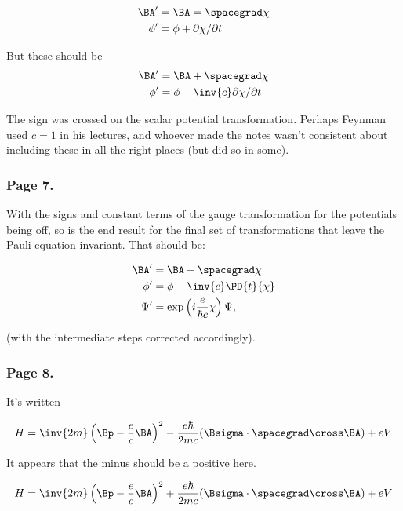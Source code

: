 \begin{align*}
\BA' &= \BA = \spacegrad \chi \\
\phi' &= \phi + \partial \chi / \partial t
\end{align*}

But these should be
\begin{align*}
\BA' &= \BA + \spacegrad \chi \\
\phi' &= \phi - \inv{c} \partial \chi / \partial t
\end{align*}

The sign was crossed on the scalar potential transformation.  Perhaps Feynman used $c=1$ in his lectures, and whoever made the notes wasn't consistent about including these in all the right places (but did so in some).

\subsubsection{Page 7.}

With the signs and constant terms of the gauge transformation for the potentials being off, so is the end result for the final set of transformations that leave the Pauli equation invariant.  That should be:

\begin{align*}
\BA' &= \BA + \spacegrad \chi \\
\phi' &= \phi - \inv{c} \PD{t}{ \chi } \\
\Psi' &= \exp\left( i \frac{e}{ \hbar c } \chi \right) \Psi,
\end{align*}

(with the intermediate steps corrected accordingly).

\subsubsection{Page 8.}

It's written

\begin{align*}
H = \inv{2m} \left( \Bp - \frac{e}{c}\BA \right)^2 - \frac{e \hbar}{2 m c} (\Bsigma \cdot \spacegrad \cross \BA) + e V
\end{align*}

It appears that the minus should be a positive here.

\begin{align*}
H = \inv{2m} \left( \Bp - \frac{e}{c}\BA \right)^2 + \frac{e \hbar}{2 m c} (\Bsigma \cdot \spacegrad \cross \BA) + e V
\end{align*}

